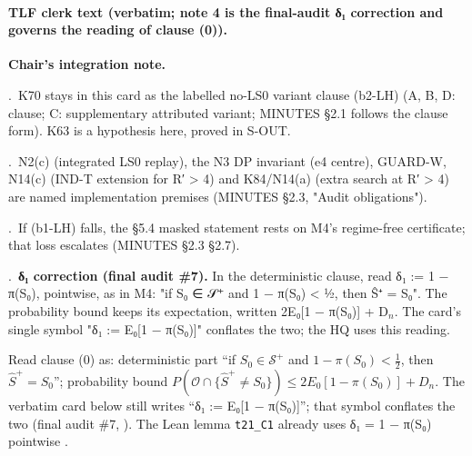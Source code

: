 \paragraph{TLF clerk text (verbatim; note 4 is the final-audit δ₁ correction and governs the reading of clause (0)).}
\par\noindent \textbf{Chair's integration note.}
\par{}.~K70 stays in this card as the labelled no-LS0 variant clause (b2-LH) (A, B, D: clause; C: supplementary attributed variant; MINUTES §2.1 follows the clause form). K63 is a hypothesis here, proved in S-OUT.
\par{}.~N2(c) (integrated LS0 replay), the N3 DP invariant (e4 centre), GUARD-W, N14(c) (IND-T extension for R′ \textgreater{} 4) and K84/N14(a) (extra search at R′ \textgreater{} 4) are named implementation premises (MINUTES §2.3, "Audit obligations").
\par{}.~If (b1-LH) falls, the §5.4 masked statement rests on M4's regime-free certificate; that loss escalates (MINUTES §2.3 §2.7).
\par{}.~\textbf{δ₁ correction (final audit \#7).} In the deterministic clause, read δ₁ := 1 − π(S₀), pointwise, as in M4: "if S₀ ∈ 𝒮⁺ and 1 − π(S₀) \textless{} ½, then Ŝ⁺ = S₀". The probability bound keeps its expectation, written 2E₀[1 − π(S₀)] + D$_{n}$. The card's single symbol "δ₁ := E₀[1 − π(S₀)]" conflates the two; the HQ uses this reading.

\begin{agentnote}[δ₁ in M5]
Read clause (0) as: deterministic part ``if $S_0\in\mathcal{S}^{+}$ and $1-\pi(S_0)<\tfrac12$, then $\hat{S}^{+}=S_0$''; probability bound $P(\mathcal{O}\cap\{\hat{S}^{+}\ne S_0\})\le2E_0[1-\pi(S_0)]+D_n$. The verbatim card below still writes ``δ₁ := E₀[1 − π(S₀)]''; that symbol conflates the two (final audit \#7, ). The Lean lemma \texttt{t21\_C1} already uses δ₁ = 1 − π(S₀) pointwise .
\end{agentnote}

